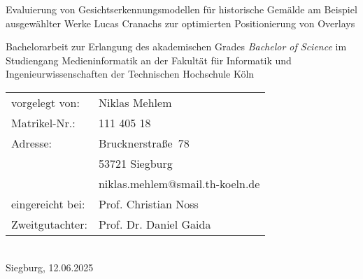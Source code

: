 \begin{titlepage}
%
\sffamily%
%
\begin{center}
\end{center}
%
\vfill
%
\begin{huge}
Evaluierung von Gesichtserkennungsmodellen für historische Gemälde am Beispiel ausgewählter Werke Lucas Cranachs zur optimierten Positionierung von Overlays\\[10mm]
\end{huge}
%
Bachelorarbeit zur Erlangung des akademischen Grades\newline
\emph{Bachelor of Science}\newline
im Studiengang Medieninformatik\newline
an der Fakultät für Informatik und Ingenieurwissenschaften\newline
der Technischen Hochschule Köln
%
\vfill
%
\begin{tabular}{@{}ll}
vorgelegt von: & Niklas Mehlem\\
Matrikel-Nr.:  & 111 405 18\\
Adresse:       & Brucknerstraße~78\\
               & 53721 Siegburg\\
               & niklas.mehlem@smail.th-koeln.de\\[5mm]
eingereicht bei:   & Prof. Christian Noss\\
Zweitgutachter: & Prof. Dr. Daniel Gaida
\end{tabular}	
%
\\[10mm]
%
Siegburg, 12.06.2025%
%
\rmfamily%
%
\end{titlepage}